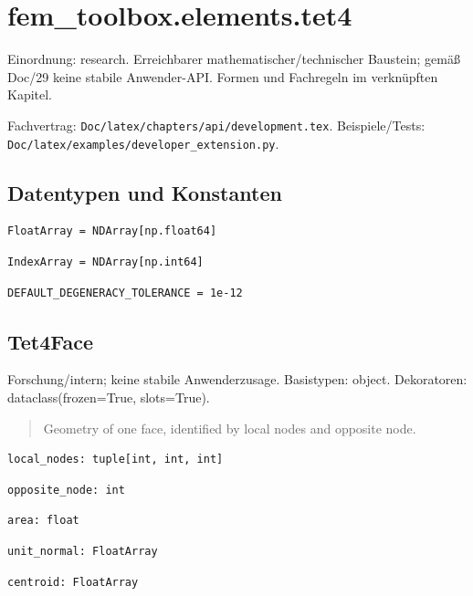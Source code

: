 \section{fem\_toolbox.elements.tet4}
Einordnung: research. Erreichbarer mathematischer/technischer Baustein; gemäß Doc/29 keine stabile Anwender-API. Formen und Fachregeln im verknüpften Kapitel.
\par Fachvertrag: \nolinkurl{Doc/latex/chapters/api/development.tex}. Beispiele/Tests:
\nolinkurl{Doc/latex/examples/developer_extension.py}.
\subsection*{Datentypen und Konstanten}
\begin{lstlisting}
FloatArray = NDArray[np.float64]
\end{lstlisting}
\begin{lstlisting}
IndexArray = NDArray[np.int64]
\end{lstlisting}
\begin{lstlisting}
DEFAULT_DEGENERACY_TOLERANCE = 1e-12
\end{lstlisting}
\subsection{Tet4Face}
Forschung/intern; keine stabile Anwenderzusage.
Basistypen: object. Dekoratoren: dataclass(frozen=True, slots=True).
\begin{quote}
Geometry of one face, identified by local nodes and opposite node.
\end{quote}
\begin{lstlisting}
local_nodes: tuple[int, int, int]
\end{lstlisting}
\begin{lstlisting}
opposite_node: int
\end{lstlisting}
\begin{lstlisting}
area: float
\end{lstlisting}
\begin{lstlisting}
unit_normal: FloatArray
\end{lstlisting}
\begin{lstlisting}
centroid: FloatArray
\end{lstlisting}
